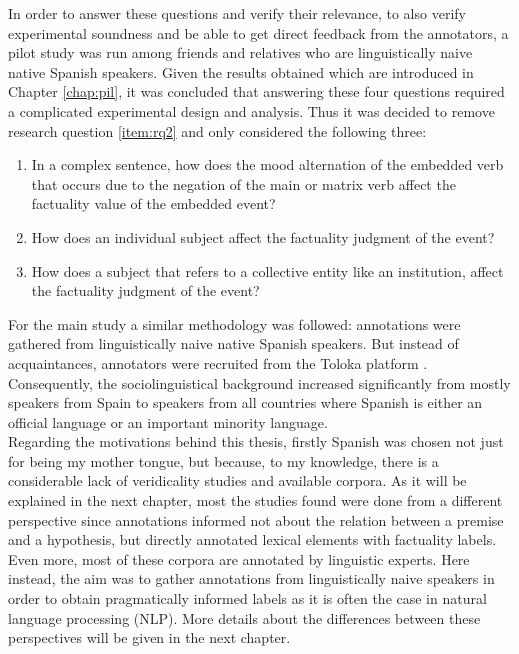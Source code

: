 In order to answer these questions and verify their relevance, to also verify experimental soundness and be able to get direct feedback from the annotators, a pilot study was run among friends and relatives who are linguistically naive native Spanish speakers. Given the results obtained which are introduced in Chapter \ref{chap:pil}, it was concluded that answering these four questions required a complicated experimental design and analysis. Thus it was decided to remove research question \ref{item:rq2} and only considered the following three:\\

\begin{enumerate}[RQ1.-]
        \item In a complex sentence, how does the mood alternation of the embedded verb that occurs due to the negation of the main or matrix verb affect the factuality value of the embedded event?
        \item How does an individual subject affect the factuality judgment of the event?
        \item How does a subject that refers to a collective entity like an institution, affect the factuality judgment of the event?\label{item:rq4}
\end{enumerate}

For the main study a similar methodology was followed: annotations were gathered from linguistically naive native Spanish speakers. But instead of acquaintances, annotators were recruited from the Toloka platform \citep{Pavlichenko2021crowdspeech}. Consequently, the sociolinguistical background increased significantly from mostly speakers from Spain to speakers from all countries where Spanish is either an official language or an important minority language.\\

Regarding the motivations behind this thesis, firstly Spanish was chosen not just for being my mother tongue, but because, to my knowledge, there is a considerable lack of veridicality studies and available corpora. As it will be explained in the next chapter, most the studies found were done from a different perspective since annotations informed not about the relation between a premise and a hypothesis, but directly annotated lexical elements with factuality labels. Even more, most of these corpora are annotated by linguistic experts. Here instead, the aim was to gather annotations from linguistically naive speakers in order to obtain pragmatically informed labels as it is often the case in natural language processing (NLP). More details about the differences between these perspectives will be given in the next chapter.\\

